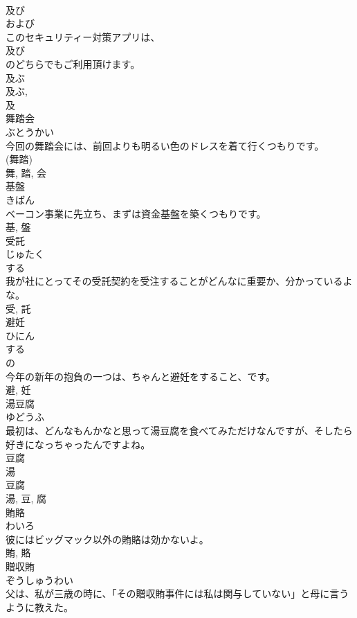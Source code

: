 \documentclass[8pt]{extreport}
\begin{document}
\begin{CJK}{UTF8}{min}
\\	及び	
\\	および	
\\	このセキュリティー対策アプリは、
\\	及び
\\	のどちらでもご利用頂けます。	
\\	及ぶ 
\\	及ぶ, 
\\	及	
\\	舞踏会	
\\	ぶとうかい	
\\	今回の舞踏会には、前回よりも明るい色のドレスを着て行くつもりです。	
\\	(舞踏) 
\\	舞, 踏, 会	
\\	基盤	
\\	きばん	
\\	ベーコン事業に先立ち、まずは資金基盤を築くつもりです。	
\\	基, 盤	
\\	受託	
\\	じゅたく	
\\	する 
\\	我が社にとってその受託契約を受注することがどんなに重要か、分かっているよな。	
\\	受, 託	
\\	避妊	
\\	ひにん	
\\	する 
\\	の 
\\	今年の新年の抱負の一つは、ちゃんと避妊をすること、です。	
\\	避, 妊	
\\	湯豆腐	
\\	ゆどうふ	
\\	最初は、どんなもんかなと思って湯豆腐を食べてみただけなんですが、そしたら好きになっちゃったんですよね。	
\\	豆腐 
\\	湯 
\\	豆腐 
\\	湯, 豆, 腐	
\\	賄賂	
\\	わいろ	
\\	彼にはビッグマック以外の賄賂は効かないよ。	
\\	賄, 賂	
\\	贈収賄	
\\	ぞうしゅうわい	
\\	父は、私が三歳の時に、「その贈収賄事件には私は関与していない」と母に言うように教えた。	

\end{CJK}
\end{document}

